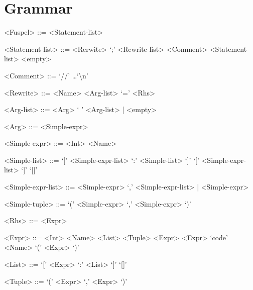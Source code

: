 \section{Grammar}
\label{sec:grammar}

\setlength{\grammarparsep}{4pt}
\setlength{\grammarindent}{10em}
\begin{grammar}
	<Fuspel> ::= <Statement-list>

	<Statement-list> ::= <Rerwite> `;' <Rewrite-list>
		\alt <Comment> <Statement-list>
		\alt <empty>

	<Comment> ::= `//' \dots `\textbackslash n'

	<Rewrite> ::= <Name> <Arg-list> `=' <Rhs>

	<Arg-list> ::= <Arg> ` ' <Arg-list> | <empty>

	<Arg> ::= <Simple-expr>

	<Simple-expr> ::= <Int>
		\alt <Simple-list>
		\alt <Simple-tuple>

	<Simple-list> ::= `[' <Simple-expr-list> `:' <Simple-list> `]'
		\alt `[' <Simple-expr-list> `]'
		\alt `[]'

	<Simple-expr-list> ::= <Simple-expr> `,' <Simple-expr-list> | <Simple-expr>
	
	<Simple-tuple> ::= `(' <Simple-expr> `,' <Simple-expr> `)'

	<Rhs> ::= <Expr>

	<Expr> ::= <Int>
		\alt <Tuple>
		 <Expr>
		\alt `code' <Name>
		\alt `(' <Expr> `)'

	<List> ::= `[' <Expr> `:' <List> `]'
		\alt `[]'
	
	<Tuple> ::= `(' <Expr> `,' <Expr> `)'
\end{grammar}
